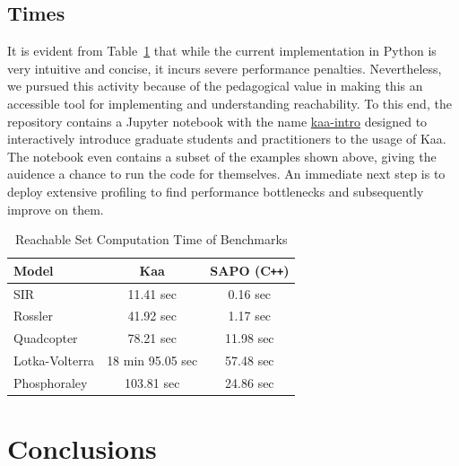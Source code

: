 \documentclass[EPiC]{easychair}
\begin{document}
\subsection{Times}

\noindent It is evident from Table~\ref{tab:one} that while the current implementation in Python is very intuitive and concise, it incurs severe performance penalties. 
%
Nevertheless, we pursued this activity because of the pedagogical value in making this an accessible tool for implementing and understanding reachability. To this end, the repository contains a Jupyter notebook with the name \href{https://github.com/Tarheel-Formal-Methods/kaa/blob/master/kaa-intro.ipynb}{kaa-intro} designed to interactively introduce graduate students and practitioners to the usage of Kaa. The notebook even contains a subset of the examples shown above, giving the auidence a chance to run the code for themselves. An immediate next step is to deploy extensive profiling to find performance bottlenecks and subsequently improve on them. 

\begin{table}[h]
\centering
\caption{Reachable Set Computation Time of Benchmarks}\label{tab:one}
\begin{tabular}{|l | c c|}
\hline
{\bf Model} &{\bf Kaa } & {\bf SAPO } (C\texttt{++})\\
\hline
SIR &  11.41 sec & 0.16 sec\\

Rossler &  41.92 sec & 1.17 sec\\

Quadcopter & 78.21 sec & 11.98 sec \\

Lotka-Volterra & 18 min 95.05 sec  & 57.48 sec\\
 
 Phosphoraley & 103.81 sec & 24.86 sec \\
\hline
\end{tabular}
\end{table}

\section{Conclusions}
\end{document}
